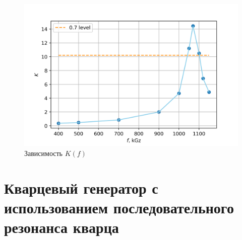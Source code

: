 \documentclass[a4paper]{article}
\begin{document}
\begin{enumerate}
    
    \begin{figure}[H]
        \begin{center}
            \includegraphics[scale = 1]{gr2.png}
            \caption{Зависимость $K(f)$}
            \label{gr2}
        \end{center}
    \end{figure}

\end{enumerate}



\section{Кварцевый генератор с использованием последовательного резонанса кварца}
\end{document}
